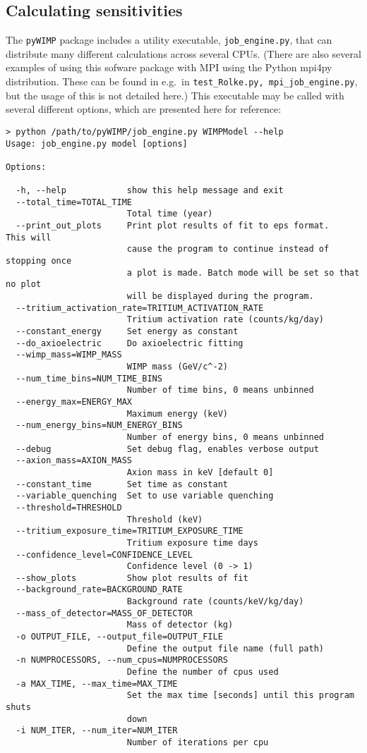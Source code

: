 		\subsection{Calculating sensitivities}
The \lstinline!pyWIMP! package includes a utility executable, \lstinline!job_engine.py!, that can distribute
many different calculations across several CPUs.  (There are also several examples of using this sofware package
with MPI using the Python mpi4py distribution.  These can be found in e.g.~in \lstinline!test_Rolke.py, mpi_job_engine.py!, 
but the usage of this is not detailed here.)  This executable may be called with several different options, which are presented
here for reference:

				\lstset{language=csh, tabsize=4}
				\begin{lstlisting}	
> python /path/to/pyWIMP/job_engine.py WIMPModel --help
Usage: job_engine.py model [options]

Options:

  -h, --help            show this help message and exit
  --total_time=TOTAL_TIME
                        Total time (year)
  --print_out_plots     Print plot results of fit to eps format.   This will
                        cause the program to continue instead of stopping once
                        a plot is made. Batch mode will be set so that no plot
                        will be displayed during the program.
  --tritium_activation_rate=TRITIUM_ACTIVATION_RATE
                        Tritium activation rate (counts/kg/day)
  --constant_energy     Set energy as constant
  --do_axioelectric     Do axioelectric fitting
  --wimp_mass=WIMP_MASS
                        WIMP mass (GeV/c^-2)
  --num_time_bins=NUM_TIME_BINS
                        Number of time bins, 0 means unbinned
  --energy_max=ENERGY_MAX
                        Maximum energy (keV)
  --num_energy_bins=NUM_ENERGY_BINS
                        Number of energy bins, 0 means unbinned
  --debug               Set debug flag, enables verbose output
  --axion_mass=AXION_MASS
                        Axion mass in keV [default 0]
  --constant_time       Set time as constant
  --variable_quenching  Set to use variable quenching
  --threshold=THRESHOLD
                        Threshold (keV)
  --tritium_exposure_time=TRITIUM_EXPOSURE_TIME
                        Tritium exposure time days
  --confidence_level=CONFIDENCE_LEVEL
                        Confidence level (0 -> 1)
  --show_plots          Show plot results of fit
  --background_rate=BACKGROUND_RATE
                        Background rate (counts/keV/kg/day)
  --mass_of_detector=MASS_OF_DETECTOR
                        Mass of detector (kg)
  -o OUTPUT_FILE, --output_file=OUTPUT_FILE
                        Define the output file name (full path)
  -n NUMPROCESSORS, --num_cpus=NUMPROCESSORS
                        Define the number of cpus used
  -a MAX_TIME, --max_time=MAX_TIME
                        Set the max time [seconds] until this program shuts
                        down
  -i NUM_ITER, --num_iter=NUM_ITER
                        Number of iterations per cpu
				\end{lstlisting}	

